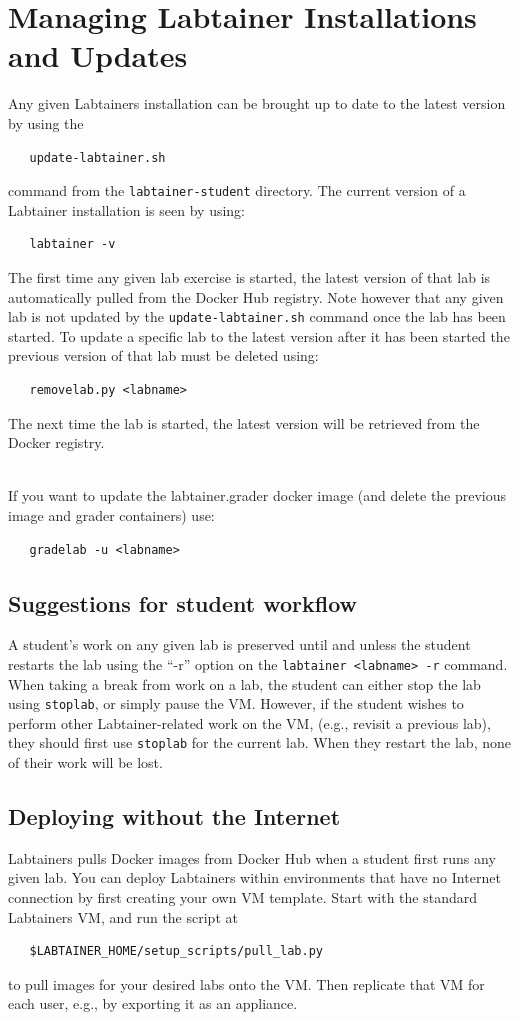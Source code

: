 \documentclass[12pt]{article}
\begin{document}
\section{Managing Labtainer Installations and Updates}
Any given Labtainers installation can be brought up to date to the latest version by using the
\begin{verbatim}
   update-labtainer.sh
\end{verbatim}
\noindent command from the {\tt labtainer-student} directory.  The current version of a Labtainer installation is seen by using:
\begin{verbatim}
   labtainer -v
\end{verbatim}
\noindent
The first time any given lab exercise is started, the latest version of that lab is automatically pulled from
the Docker Hub registry.
Note however that any given lab is not updated by the {\tt update-labtainer.sh} command once the lab has been started.  
To update a specific lab to the latest version after it has been started the previous version of that lab must be deleted
using:
\begin{verbatim}
   removelab.py <labname>
\end{verbatim}
\noindent The next time the lab is started, the latest version will be retrieved from the Docker registry.

\noindent \\If you want to update the labtainer.grader docker image (and delete the previous image and grader containers) use:
\begin{verbatim}
   gradelab -u <labname>
\end{verbatim}


\subsection{Suggestions for student workflow}
A student's work on any given lab is preserved until and unless the student restarts the lab using the ``-r'' 
option on the {\tt labtainer <labname> -r} command.  When taking a break from work on a lab, the student can
either stop the lab using {\tt stoplab}, or simply pause the VM.  However, if the student wishes to perform other
Labtainer-related work on the VM, (e.g., revisit a previous lab), they should first use {\tt stoplab} for the current
lab.  When they restart the lab, none of their work will be lost.

\subsection{Deploying without the Internet}
Labtainers pulls Docker images from Docker Hub when a student first runs any given lab.  You can deploy
Labtainers within environments that have no Internet connection by first creating your own 
VM template.  Start with the standard Labtainers VM, and run the script at 
\begin{verbatim}
   $LABTAINER_HOME/setup_scripts/pull_lab.py
\end{verbatim}
\noindent to pull images for your desired labs onto the VM.  Then replicate that VM for each user, e.g., by
exporting it as an appliance.
\end{document}
